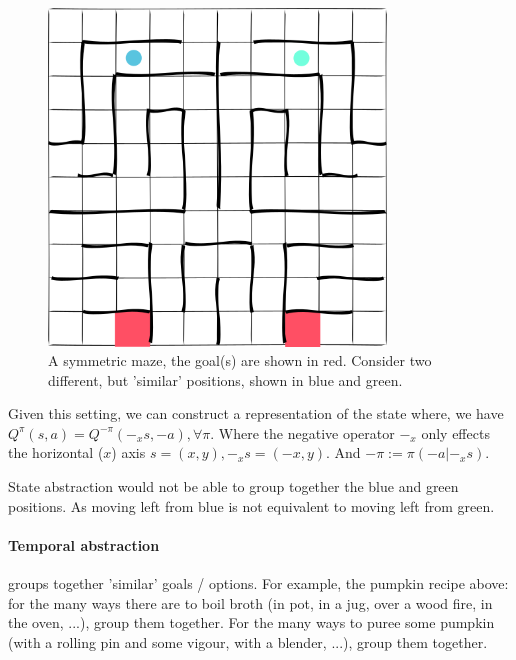 \begin{figure}[h!]
\centering
\includegraphics[width=0.8\textwidth,height=0.4\textheight]{../../pictures/drawings/maze.png}
\caption{A symmetric maze, the goal(s) are shown in red.
Consider two different, but 'similar' positions, shown in blue and green.}
\end{figure}

Given this setting, we can construct a representation of the state \footnotemark[11] where,
we have $Q^{\pi}(s, a) = Q^{-\pi}(-_xs, -a), \forall \pi$.
Where the negative operator $-_x$ only effects the horizontal ($x$) axis $s = (x, y), -_xs = (-x, y)$.
And $-\pi := \pi(-a|-_xs)$. \footnotemark[21]



State abstraction would not be able to group together the blue and green positions.
As moving left from blue is not equivalent to moving left from green.

\paragraph{Temporal abstraction} groups together 'similar' goals / options.
For example, the pumpkin recipe above: for the many ways there are to boil broth
(in pot, in a jug, over a wood fire, in the oven, ...), group them together.
For the many ways to puree some pumpkin (with a rolling pin and some vigour, with a blender, ...), group them together.

